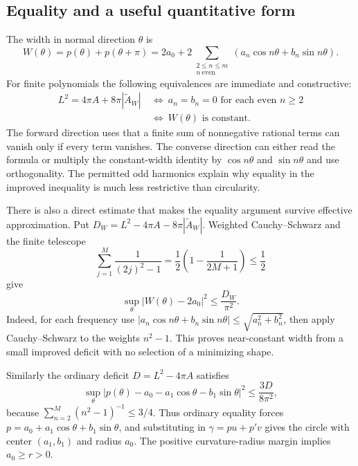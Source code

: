 \subsection{Equality and a useful quantitative form}
The width in normal direction \(\theta\) is
\[
 W(\theta)=p(\theta)+p(\theta+\pi)
 =2a_0+2\sum_{\substack{2\le n\le m\\n\ \text{even}}}
                   (a_n\cos n\theta+b_n\sin n\theta).
\]
For finite polynomials the following equivalences are immediate and
constructive:
\[
 \begin{split}
 L^2=4\pi A+8\pi|\widetilde A_W|
 &\ \Longleftrightarrow\ a_n=b_n=0\text{ for each even }n\ge2\\
 &\ \Longleftrightarrow\ W(\theta)\text{ is constant}.
 \end{split}
\]
The forward direction uses that a finite sum of nonnegative rational
terms can vanish only if every term vanishes.  The converse direction
can either read the formula or multiply the constant-width identity
by \(\cos n\theta\) and \(\sin n\theta\) and use orthogonality.
The permitted odd harmonics explain why equality in the improved
inequality is much less restrictive than circularity.

There is also a direct estimate that makes the equality argument
survive effective approximation.  Put
\(D_W=L^2-4\pi A-8\pi|\widetilde A_W|\).  Weighted
Cauchy--Schwarz and the finite telescope
\[
 \sum_{j=1}^{M}\frac1{(2j)^2-1}
 =\frac12\left(1-\frac1{2M+1}\right)\le\frac12
\]
give
\begin{equation}\label{eq:width-stability}
       \sup_\theta|W(\theta)-2a_0|^2\le\frac{D_W}{\pi^2}.
\end{equation}
Indeed, for each frequency use
\(|a_n\cos n\theta+b_n\sin n\theta|
 \le\sqrt{a_n^2+b_n^2}\), then apply Cauchy--Schwarz to the
weights \(n^2-1\).  This proves near-constant width from a small
improved deficit with no selection of a minimizing shape.

Similarly the ordinary deficit
\(D=L^2-4\pi A\) satisfies
\[
 \sup_\theta
 |p(\theta)-a_0-a_1\cos\theta-b_1\sin\theta|^2
 \le\frac{3D}{8\pi^2},
\]
because
\(\sum_{n=2}^{M}(n^2-1)^{-1}\le3/4\).
Thus ordinary equality forces
\(p=a_0+a_1\cos\theta+b_1\sin\theta\), and substituting in
\(\gamma=pu+p'v\) gives the circle with center \((a_1,b_1)\)
and radius \(a_0\).  The positive curvature-radius margin implies
\(a_0\ge r>0\).

